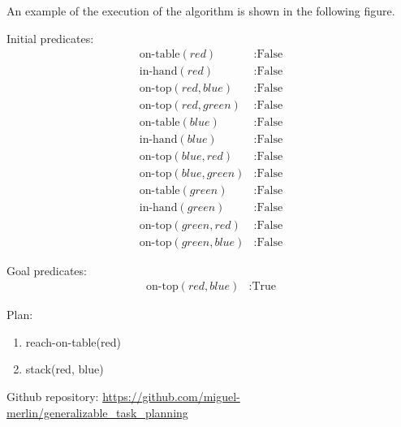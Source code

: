 \documentclass[
	a4paper, %
	10pt, %
	unnumberedsections, %
	twoside, %
]{LTJournalArticle}
\begin{document}
An example of the execution of the algorithm is shown in the following figure.
\par
Initial predicates:
\begin{align*}
    \text{on-table}(red) & : \text{False} \\
    \text{in-hand}(red) & : \text{False} \\
    \text{on-top}(red, blue) & : \text{False} \\
    \text{on-top}(red, green) & : \text{False} \\
    \text{on-table}(blue) & : \text{False} \\
    \text{in-hand}(blue) & : \text{False} \\
    \text{on-top}(blue, red) & : \text{False} \\
    \text{on-top}(blue, green) & : \text{False} \\
    \text{on-table}(green) & : \text{False} \\
    \text{in-hand}(green) & : \text{False} \\
    \text{on-top}(green, red) & : \text{False} \\
    \text{on-top}(green, blue) & : \text{False}
\end{align*}

Goal predicates:
\begin{align*}
    \text{on-top}(red, blue) & : \text{True}
\end{align*}

Plan:
\begin{enumerate}
    \item reach-on-table(red)
    \item stack(red, blue)
\end{enumerate}

Github repository: \url{https://github.com/miguel-merlin/generalizable_task_planning}\





\end{document}
